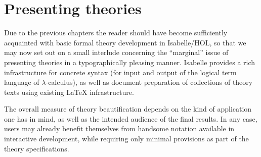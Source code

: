 
\chapter{Presenting theories}
\label{ch:thy-present}

Due to the previous chapters the reader should have become sufficiently
acquainted with basic formal theory development in Isabelle/HOL, so that we
may now set out on a small interlude concerning the ``marginal'' issue of
presenting theories in a typographically pleasing manner.  Isabelle provides a
rich infrastructure for concrete syntax (for input and output of the logical
term language of $\lambda$-calculus), as well as document preparation of
collections of theory texts using existing {\LaTeX} infrastructure.

The overall measure of theory beautification depends on the kind of
application one has in mind, as well as the intended audience of the final
results.  In any case, users may already benefit themselves from handsome
notation available in interactive development, while requiring only minimal
provisions as part of the theory specifications.



